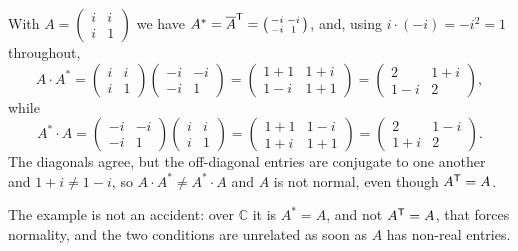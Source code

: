 \begin{exercisesolution}
\label{sol:symmetric_not_normal}
With $A = \left(\begin{smallmatrix} i & i \\ i & 1 \end{smallmatrix}\right)$ we have $A^* = \overline{A}^{\mathsf{T}} = \left(\begin{smallmatrix} -i & -i \\ -i & 1 \end{smallmatrix}\right)$, and, using $i \cdot (-i) = -i^2 = 1$ throughout,
\[
    A \cdot A^* = \begin{pmatrix} i & i \\ i & 1 \end{pmatrix} \begin{pmatrix} -i & -i \\ -i & 1 \end{pmatrix} = \begin{pmatrix} 1 + 1 & 1 + i \\ 1 - i & 1 + 1 \end{pmatrix} = \begin{pmatrix} 2 & 1+i \\ 1-i & 2 \end{pmatrix},
\]
while
\[
    A^* \cdot A = \begin{pmatrix} -i & -i \\ -i & 1 \end{pmatrix} \begin{pmatrix} i & i \\ i & 1 \end{pmatrix} = \begin{pmatrix} 1 + 1 & 1 - i \\ 1 + i & 1 + 1 \end{pmatrix} = \begin{pmatrix} 2 & 1-i \\ 1+i & 2 \end{pmatrix}.
\]
The diagonals agree, but the off-diagonal entries are conjugate to one another and $1 + i \neq 1 - i$, so $A \cdot A^* \neq A^* \cdot A$ and $A$ is not normal, even though $A^{\mathsf{T}} = A$.

The example is not an accident: over $\mathbb{C}$ it is $A^* = A$, and not $A^{\mathsf{T}} = A$, that forces normality, and the two conditions are unrelated as soon as $A$ has non-real entries.
\end{exercisesolution}

